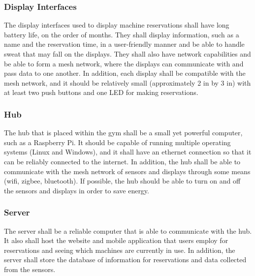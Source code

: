 \documentclass[PPFS.tex]{template/subfiles}
\begin{document}
\subsubsection{Display Interfaces}
The display interfaces used to display machine reservations shall have long battery life, on the order of months. They shall display information, such as a name and the reservation time, in a user-friendly manner and be able to handle sweat that may fall on the displays. They shall also have network capabilities and be able to form a mesh network, where the displays can communicate with and pass data to one another. In addition, each display shall be compatible with the mesh network, and it should be relatively small (approximately 2 in by 3 in) with at least two push buttons and one LED for making reservations.

\subsubsection{Hub}
The hub that is placed within the gym shall be a small yet powerful computer, such as a Raspberry Pi. It should be capable of running multiple operating systems (Linux and Windows), and it shall have an ethernet connection so that it can be reliably connected to the internet. In addition, the hub shall be able to communicate with the mesh network of sensors and displays through some means (wifi, zigbee, bluetooth). If possible, the hub should be able to turn on and off the sensors and displays in order to save energy.

\subsubsection{Server}
The server shall be a reliable computer that is able to communicate with the hub. It also shall host the website and mobile application that users employ for reservations and seeing which machines are currently in use. In addition, the server shall store the database of information for reservations and data collected from the sensors.
\end{document}
